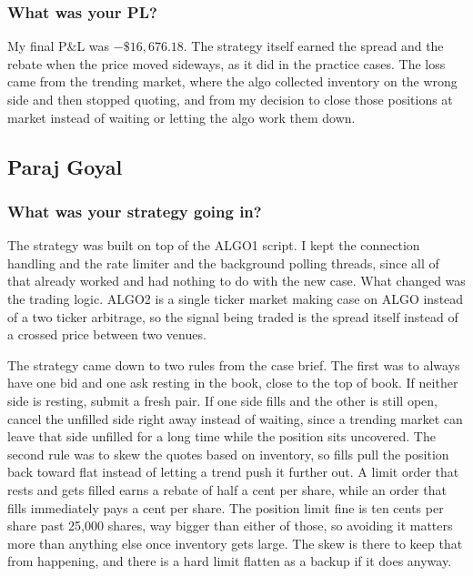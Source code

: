 \documentclass{article}
\begin{document}
\subsubsection{What was your PL?}

My final P\&L was $-\$16{,}676.18$. The strategy itself earned the spread and the rebate when the price moved sideways, as it did in the practice cases. The loss came from the trending market, where the algo collected inventory on the wrong side and then stopped quoting, and from my decision to close those positions at market instead of waiting or letting the algo work them down.


\subsection{Paraj Goyal}
\subsubsection{What was your strategy going in?}
The strategy was built on top of the ALGO1 script. I kept the connection handling and the rate limiter and the background polling threads, since all of that already worked and had nothing to do with the new case. What changed was the trading logic. ALGO2 is a single ticker market making case on ALGO instead of a two ticker arbitrage, so the signal being traded is the spread itself instead of a crossed price between two venues.

The strategy came down to two rules from the case brief. The first was to always have one bid and one ask resting in the book, close to the top of book. If neither side is resting, submit a fresh pair. If one side fills and the other is still open, cancel the unfilled side right away instead of waiting, since a trending market can leave that side unfilled for a long time while the position sits uncovered. The second rule was to skew the quotes based on inventory, so fills pull the position back toward flat instead of letting a trend push it further out. A limit order that rests and gets filled earns a rebate of half a cent per share, while an order that fills immediately pays a cent per share. The position limit fine is ten cents per share past 25,000 shares, way bigger than either of those, so avoiding it matters more than anything else once inventory gets large. The skew is there to keep that from happening, and there is a hard limit flatten as a backup if it does anyway.
\end{document}
